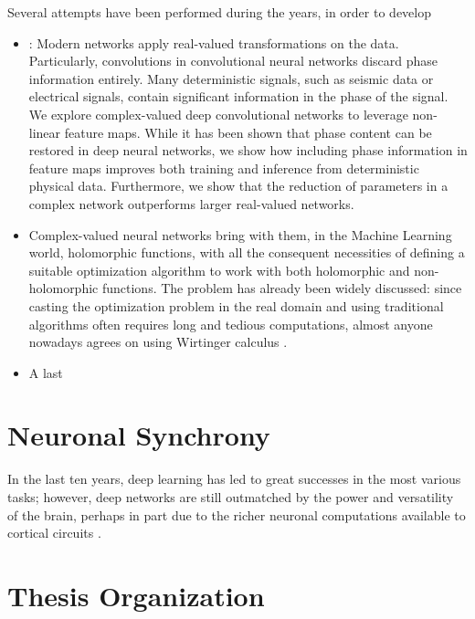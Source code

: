 \documentclass[../main.tex]{subfiles}
\begin{document}
Several attempts have been performed during the years, in order to develop 

\begin{itemize}
	\item \cite{Dramsch_seismic}: Modern networks apply real-valued transformations on the
	data. Particularly, convolutions in convolutional neural networks discard phase
	information entirely. Many deterministic signals, such as seismic data or electrical
	signals, contain significant information in the phase of the signal. We explore
	complex-valued deep convolutional networks to leverage non-linear feature maps. While it has been shown that
	phase content can be restored in deep neural networks, we show how including
	phase information in feature maps improves both training and inference from
	deterministic physical data. Furthermore, we show that the reduction of parameters
	in a complex network outperforms larger real-valued networks.
	\item Complex-valued neural networks bring with them, in the Machine Learning world,
	 holomorphic functions, with all the consequent necessities of defining a suitable optimization algorithm to work with both holomorphic and non-holomorphic functions.
	The problem has already been widely discussed: since casting the optimization problem in the real domain and using traditional algorithms often requires long and tedious computations, almost anyone nowadays agrees on using Wirtinger calculus \cite{amin_wirtinger, kreutzdelgado2009complex, Nitta_complexBP}.
	\item A last 
\end{itemize}

\section{Neuronal Synchrony}

In the last ten years, deep learning has led to great successes in the most various tasks; however, deep networks are still outmatched by the power and versatility of the brain, perhaps in part due to the
richer neuronal computations available to cortical circuits \cite{reichert2014neuronal}.



\section{Thesis Organization}
\end{document}

